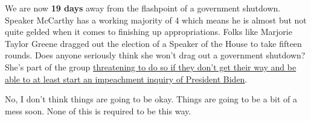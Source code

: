 We are now \textbf{19 days} away from the flashpoint of a government
shutdown. Speaker McCarthy has a working majority of 4 which means he is
almost but not quite gelded when it comes to finishing up
appropriations. Folks like Marjorie Taylor Greene dragged out the
election of a Speaker of the House to take fifteen rounds. Does anyone
seriously think she won't drag out a government shutdown? She's part of
the group
\href{http://web.archive.org/web/20230911213350/https://www.cnn.com/2023/09/11/politics/impeachment-government-shutdown-house-return/index.html}{threatening
to do so if they don't get their way and be able to at least start an
impeachment inquiry of President Biden}.

No, I don't think things are going to be okay. Things are going to be a
bit of a mess soon. None of this is required to be this way.
